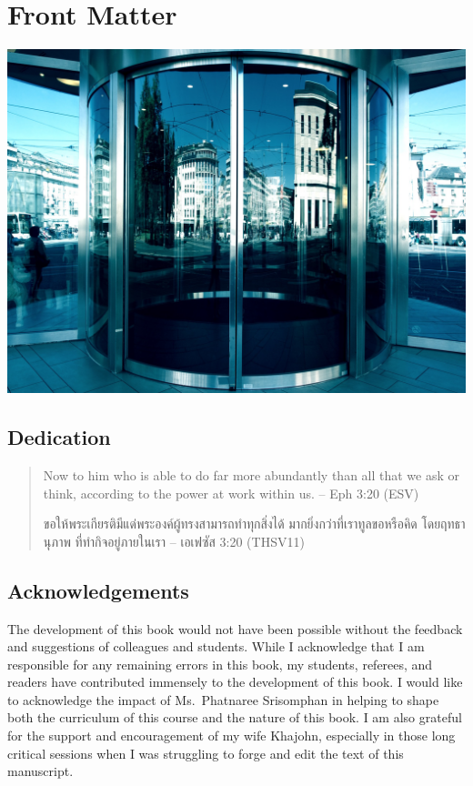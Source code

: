 \documentclass[]{book}
\begin{document}
\hypertarget{front-matter}{%
\chapter*{Front Matter}\label{front-matter}}

\includegraphics[width=0.9\linewidth]{images/door}

\hypertarget{dedication}{%
\section*{Dedication}\label{dedication}}

\begin{quote}
Now to him who is able to do far more abundantly
than all that we ask or think, according
to the power at work within us.
-- Eph 3:20 (ESV)

ขอให้พระเกียรติมีแด่พระองค์ผู้ทรงสามารถทำทุกสิ่งได้
มากยิ่งกว่าที่เราทูลขอหรือคิด โดยฤทธานุภาพ
ที่ทำกิจอยู่ภายในเรา
-- เอเฟซัส 3:20 (THSV11)
\end{quote}

\hypertarget{acknowledgements}{%
\section*{Acknowledgements}\label{acknowledgements}}

The development of this book would not have been possible without the feedback and suggestions of colleagues and students. While I acknowledge that I am responsible for any remaining errors in this book, my students, referees, and readers have contributed immensely to the development of this book. I would like to acknowledge the impact of Ms.~Phatnaree Srisomphan in helping to shape both the curriculum of this course and the nature of this book. I am also grateful for the support and encouragement of my wife Khajohn, especially in those long critical sessions when I was struggling to forge and edit the text of this manuscript.
\end{document}
